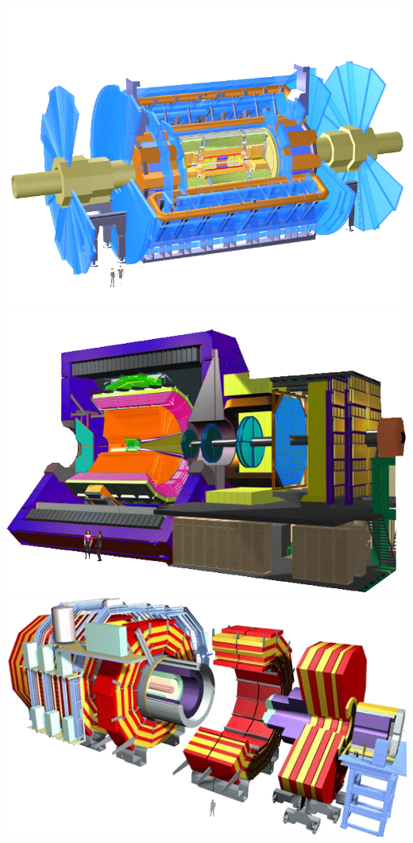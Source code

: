 \marginpar
{
	\includegraphics[width=\marginparwidth]{LHC/atlas.png}
    	\label{atlas}
}
\marginpar
{
	\includegraphics[width=\marginparwidth]{LHC/alice.png}
    	\label{alice}
}
\marginpar
{
	\includegraphics[width=\marginparwidth]{LHC/cms.png}
    	\label{cms}
}
